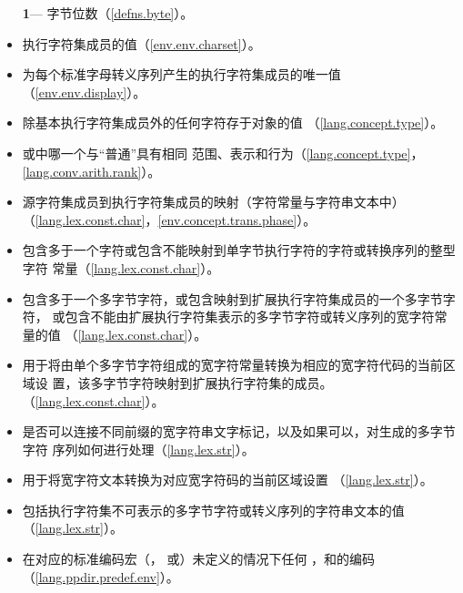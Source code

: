\begin{itemize} %
  \item[\textbf{1}\hspace{5pt}---]{字节位数（\ref{defns.byte}）。}
  \item{执行字符集成员的值（\ref{env.env.charset}）。}
  \item{为每个标准字母转义序列产生的执行字符集成员的唯一值
    （\ref{env.env.display}）。}
  \item{除基本执行字符集成员外的任何字符存于对象的值
    （\ref{lang.concept.type}）。}
  \item{或中哪一个与``普通''具有相同
    范围、表示和行为（\ref{lang.concept.type}，\ref{lang.conv.arith.rank}）。}
  \item{源字符集成员到执行字符集成员的映射（字符常量与字符串文本中）
    （\ref{lang.lex.const.char}，\ref{env.concept.trans.phase}）。}
  \item{包含多于一个字符或包含不能映射到单字节执行字符的字符或转换序列的整型字符
    常量（\ref{lang.lex.const.char}）。}
  \item{包含多于一个多字节字符，或包含映射到扩展执行字符集成员的一个多字节字符，
    或包含不能由扩展执行字符集表示的多字节字符或转义序列的宽字符常量的值
    （\ref{lang.lex.const.char}）。}
  \item{用于将由单个多字节字符组成的宽字符常量转换为相应的宽字符代码的当前区域设
    置，该多字节字符映射到扩展执行字符集的成员。（\ref{lang.lex.const.char}）。}
  \item{是否可以连接不同前缀的宽字符串文字标记，以及如果可以，对生成的多字节字符
    序列如何进行处理（\ref{lang.lex.str}）。}
  \item{用于将宽字符文本转换为对应宽字符码的当前区域设置
    （\ref{lang.lex.str}）。}
  \item{包括执行字符集不可表示的多字节字符或转义序列的字符串文本的值
    （\ref{lang.lex.str}）。}
  \item{在对应的标准编码宏（，
    或）未定义的情况下任何
    ，和的编码
    （\ref{lang.ppdir.predef.env}）。}
\end{itemize}

